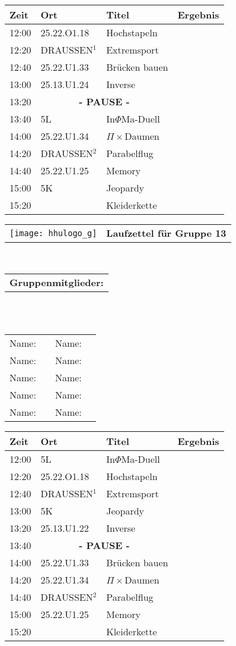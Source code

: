 \documentclass[a4paper,10pt]{article}
\def\spiela{25.22.U1.33 & Brücken bauen}
\def\spielb{DRAUSSEN$^1$ \footnotetext[1]{zwischen 25.22.U1 und 25.13.U1} & Extremsport}
\def\spielc{25.22.O1.18 & Hochstapeln}
\def\spield{5L & In$\Phi $Ma-Duell}
\def\spiele{ 25.13.U1.22 & Inverse}
\def\spielee{ 25.13.U1.24 & Inverse}
\def\spielf{5K & Jeopardy}
\def\spielgg{25.22.U1.25 & Memory}
\def\spielh{DRAUSSEN$^2$ \footnotetext[2]{zwischen 25.22.U1 und 25.33.U1} & Parabelflug}
\def\spieli{ 25.22.U1.34 & $\Pi \times $Daumen}
\def\spielj{ & Kleiderkette}
\def\pause{\multicolumn{2}{|c|}{\textbf{- PAUSE -}}}
\newcommand{\oben}[1]{

\begin{tabularx}{\textwidth}{lc}
  \texttt{[image: hhulogo\_g]}
& {\Huge \textbf{Laufzettel für Gruppe #1}}
\end{tabularx}
\large
\vspace{0.5cm} \\
\begin{tabularx}{\textwidth}{l}\textbf{Gruppenmitglieder:} \end{tabularx}\\ \phantom{blub}\\
\begin{tabularx}{\textwidth}{p{0.1\textwidth}p{0.4\textwidth}p{0.1\textwidth}p{0.4\textwidth}}
Name: & \underline{\hspace{6cm}} & Name: & \underline{\hspace{6cm}}\\
Name: & \underline{\hspace{6cm}} & Name: & \underline{\hspace{6cm}}\\
Name: & \underline{\hspace{6cm}} & Name: & \underline{\hspace{6cm}}\\
Name: & \underline{\hspace{6cm}} & Name: & \underline{\hspace{6cm}}\\
Name: & \underline{\hspace{6cm}} & Name: & \underline{\hspace{6cm}}\\
\end{tabularx}



}
\begin{document}
  \LARGE
  \begin{center}
  \vspace{1cm}
  \begin{tabularx}{\textwidth}{p{2.5cm}||p{4.5cm}|p{6.5cm}|l}

  \textbf{Zeit}  & \textbf{Ort} 	&\textbf{Titel} 		& \textbf{Ergebnis} 	\\ \hline \hline

  12:00 &\spielc			&		\\ \hline
  12:20 &\spielb			&		\\ \hline
  12:40 &\spiela			&		\\ \hline

  13:00 &\spielee		 	&		\\ \hline
  13:20 &\pause			&		\\ \hline
  13:40 &\spield			&		\\ \hline

  14:00 &\spieli			&		\\ \hline
  14:20 &\spielh			&		\\ \hline
  14:40 &\spielgg			&		\\ \hline 

  15:00 &\spielf			&		\\ \hline \hline
  15:20 &\spielj			&

  \end{tabularx}
  \end{center}

  \newpage


  \oben{13}

  \LARGE
  \begin{center}
  \vspace{1cm}
  \begin{tabularx}{\textwidth}{p{2.5cm}||p{4.5cm}|p{6.5cm}|l}

  \textbf{Zeit}  & \textbf{Ort} 	&\textbf{Titel} 		& \textbf{Ergebnis} 	\\ \hline \hline

  12:00 &\spield			&		\\ \hline
  12:20 &\spielc			&		\\ \hline
  12:40 &\spielb			&		\\ \hline

  13:00 &\spielf		 	&		\\ \hline
  13:20 &\spiele			&		\\ \hline
  13:40 &\pause			&		\\ \hline

  14:00 &\spiela			&		\\ \hline
  14:20 &\spieli			&		\\ \hline
  14:40 &\spielh			&		\\ \hline 

  15:00 &\spielgg			&		\\ \hline \hline
  15:20 &\spielj			&

  \end{tabularx}
  \end{center}
\end{document}
